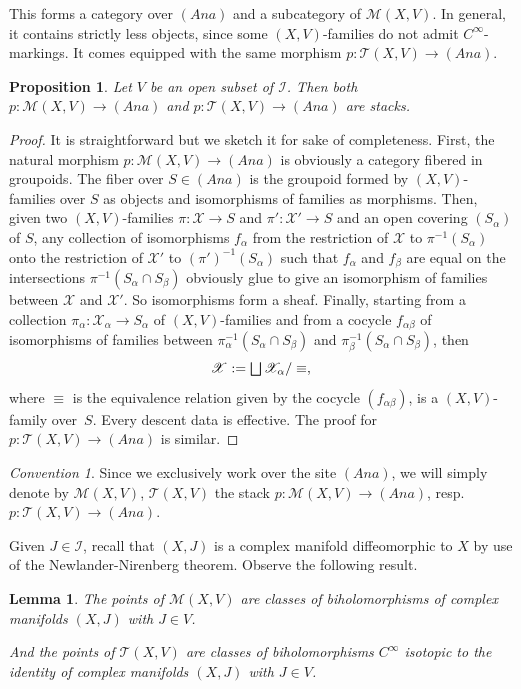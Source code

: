 \documentclass[JEP,XML,SOM,Unicode]{cedram}
\let\mathcal\mathscr
\let\oldbigsqcup\bigsqcup
\renewcommand{\bigsqcup}{\mathop{\textstyle\oldbigsqcup}\displaylimits}
\newcommand{\Ana}{\mathit{Ana}}
\theoremstyle{plain}
\newtheorem{proposition}[theorem]{Proposition}
\newtheorem{lemma}[theorem]{Lemma}
\theoremstyle{definition}
\theoremstyle{remark}
\newtheorem{convention}[theorem]{Convention}
\numberwithin{equation}{section}
\newcommand{\cI}{\mathcal{I}}
\let\uniondisjointe\bigsqcup
\begin{document}
This forms a category over $(\Ana)$ and a subcategory of $\mathcal M(X,V)$. In general, it contains strictly less objects, since some $(X,V)$-families do not admit $C^\infty$-markings. It comes equipped with the same morphism $p : \mathcal T(X,V)\to (\Ana)$.

\begin{proposition}
\label{Theyarestacks}
Let $V$ be an open subset of $\cI$. Then both $p: \mathcal M(X,V)\to (\Ana)$ and $p: \mathcal T(X,V)\to (\Ana)$ are stacks.
\end{proposition}

\begin{proof}
It is straightforward but we sketch it for sake of completeness. First, the natural morphism $p:\mathcal M(X,V)\to(\Ana)$ is obviously a category fibered in groupoids. The fiber over $S\in(\Ana)$ is the groupoid formed by $(X,V)$-families over $S$ as \hbox{objects} and isomorphisms of families as morphisms. Then, given two $(X,V)$-families \hbox{$\pi : \mathcal X\to S$} and $\pi' : \mathcal X'\to S$ and an open covering $(S_\alpha)$ of $S$, any collection of isomorphisms $f_\alpha$ from the restriction of $\mathcal X$ to $\pi^{-1}(S_\alpha)$ onto the restriction of $\mathcal X'$ to $(\pi')^{-1}(S_\alpha)$ such that $f_\alpha$ and $f_\beta$ are equal on the intersections $\pi^{-1}(S_\alpha\cap S_\beta)$ obviously glue to give an isomorphism of families between $\mathcal X$ and $\mathcal X'$. So isomorphisms form a sheaf. Finally, starting from a collection $\pi_\alpha :\mathcal X_\alpha\to S_\alpha$ of $(X,V)$-families and from a cocycle $f_{\alpha\beta}$ of isomorphisms of families between $\pi^{-1}_\alpha (S_\alpha\cap S_\beta)$ and $\pi^{-1}_\beta (S_\alpha\cap S_\beta)$, then
\[
\mathcal X:=\uniondisjointe \mathcal X_\alpha/\equiv,
\]
where $\equiv$ is the equivalence relation given by the cocycle $(f_{\alpha\beta})$, is a $(X,V)$-family over~$S$. Every descent data is effective. The proof for $p:\mathcal T(X,V)\to (\Ana)$ is similar.
\end{proof}
\begin{convention}
Since we exclusively work over the site $(\Ana)$, we will simply denote by $\mathcal M(X,V)$, \resp $\mathcal T(X,V)$ the stack $p:\mathcal M(X,V)\to(\Ana)$, resp.\ \hbox{$p:\mathcal T(X,V)\to (\Ana)$}.
\end{convention}
Given $J\in\cI$, recall that $(X,J)$ is a complex manifold diffeomorphic to $X$ by use of the Newlander-Nirenberg theorem. Observe the following result.

\begin{lemma}
\label{stackspoints}
The points of $\mathcal M(X,V)$ are classes of biholomorphisms of complex manifolds $(X,J)$ with $J\in V$.

And the points of $\mathcal T(X,V)$ are classes of biholomorphisms $C^\infty$ isotopic to the identity of complex manifolds $(X,J)$ with $J\in V$.
\end{lemma}
\end{document}
